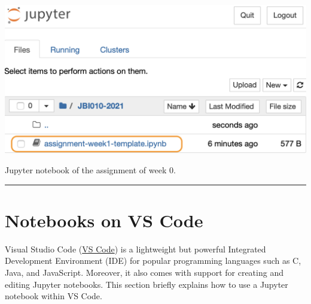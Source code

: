 \documentclass{latex-template/tufte-handout}
\begin{document}
\begin{marginfigure}%
  \includegraphics[width=1.2\linewidth]{assets/open-nb}
  \caption{Jupyter notebook of the assignment of week 0.}
  \label{fig:week-0}
\end{marginfigure}

\begin{center}\rule{\linewidth}{0.5pt}\end{center}


\section{Notebooks on VS Code}
Visual Studio Code (\href{https://code.visualstudio.com/}{VS Code}) is a lightweight but powerful Integrated Development Environment (IDE) for popular programming languages such as C, Java, and JavaScript. 
Moreover, it also comes with support for creating and editing Jupyter notebooks.
This section briefly explains how to use a Jupyter notebook within VS Code.
\end{document}
